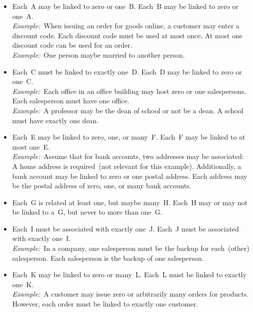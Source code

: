 \begin{itemize}%
%
\item {} Each~A may be linked to zero or one~B. Each~B may be linked to zero or one~A.~\cite{BS2023G:CFNIERD}\\%
\emph{Example:}~When issuing an order for goods online, a customer may enter a discount code.
Each discount code must be used at most once.
At most one discount code can be used for an order.~\cite{BS2023G:CFNIERD}\\%
\emph{Example:}~One person maybe married to another person.~\cite{R2024CDS:E}%
%
\item {} Each~C must be linked to exactly one~D. Each~D may be linked to zero or one~C.~\cite{T2025CDBMS:ERM}\\%
\emph{Example:}~Each office in an office building may host zero or one salespersons.
Each salesperson must have one office.~\cite{T2025CDBMS:ERM}\\%
\emph{Example:}~A professor may be the dean of school or not be a dean.
A school must have exactly one dean.~\cite{R2024CDS:E}%
%
\item {} Each~E may be linked to zero, one, or many~F. Each~F may be linked to at most one~E.~\cite{MA2006MAC:DMERDED}\\%
\emph{Example:}~Assume that for bank accounts, two addresses may be associated:
A home address is required~(not relevant for this example).
Additionally, a bank account may be linked to zero or one postal address.
Each address may be the postal address of zero, one, or many bank accounts.~\cite{MA2006MAC:DMERDED}%
%
\item {} Each~G is related at least one, but maybe many~H. Each~H may or may not be linked to a~G, but never to more than one~G.%
%
\item {} Each~I must be associated with exactly one~J. Each~J must be associated with exactly one~I.\\%
\emph{Example:}~In a company, one salesperson must be the backup for each~(other) salesperson.
Each salesperson is the backup of one salesperson.~\cite{T2025CDBMS:ERM}%
%
\item {} Each~K may be linked to zero or many~L. Each~L must be linked to exactly one~K.~\cite{MA2006MAC:DMERDED,BS2023G:CFNIERD}\\%
\emph{Example:}~A customer may issue zero or arbitrarily many orders for products.
However, each order must be linked to exactly one customer.~\cite{BS2023G:CFNIERD}\\%

\end{itemize}
